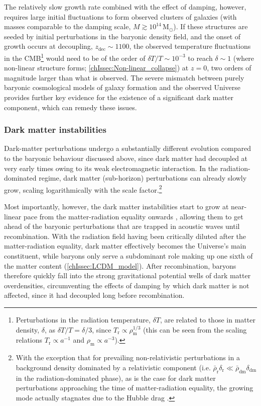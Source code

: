 The relatively slow growth rate combined with the effect of \citeauthor{1968ApJ...151..459S} damping, however, requires large initial fluctuations to form observed clusters of galaxies (with masses comparable to the damping scale, $M \gtrsim 10^{14} \, \mathrm{M_\odot}$). If these structures are seeded by initial perturbations in the baryonic density field, and the onset of growth occurs at decoupling, $z_\text{dec} \sim 1100$, the observed temperature fluctuations in the CMB\footnote{Perturbations in the radiation temperature, $\delta T$, are related to those in matter density, $\delta$, as $\delta T / T = \delta/3$, since $T_\text{r} \propto \rho_\text{m}^{1/3}$ (this can be seen from the scaling relations $T_\text{r} \propto a^{-1}$ and $\rho_\text{m} \propto a^{-3}$).} would need to be of the order of $\delta T / T \sim 10^{-3}$ to reach $\delta \sim 1$ (where non-linear structure forms; \cref{chIssec:Non-linear_collapse}) at $z = 0$, two orders of magnitude larger than what is observed. The severe mismatch between purely baryonic cosmological models of galaxy formation and the observed Universe provides further key evidence for the existence of a significant dark matter component, which can remedy these issues.

\subsubsection{Dark matter instabilities}
\label{chIsssec:Dark_matter_instabilities}

Dark-matter perturbations undergo a substantially different evolution compared to the baryonic behaviour discussed above, since dark matter had decoupled at very early times owing to its weak electromagnetic interaction. In the radiation-dominated regime, dark matter (sub-horizon) perturbations can already slowly grow, scaling logarithmically with the scale factor.\footnote{With the exception that for prevailing non-relativistic perturbations in a background density dominated by a relativistic component (i.e. $\bar{\rho}_\text{r} \delta_\text{r} \ll \bar{\rho}_\text{dm} \delta_\text{dm}$ in the radiation-dominated phase), as is the case for dark matter perturbations approaching the time of matter-radiation equality, the growing mode actually stagnates due to the Hubble drag \citep{1974A&A....37..225M}.}

Most importantly, however, the dark matter instabilities start to grow at near-linear pace from the matter-radiation equality onwards \citep{1992ARA&A..30..499C}, allowing them to get ahead of the baryonic perturbations that are trapped in acoustic waves until recombination. With the radiation field having been critically diluted after the matter-radiation equality, dark matter effectively becomes the Universe's main constituent, while baryons only serve a subdominant role making up one sixth of the matter content (\cref{chIssec:LCDM_model}). After recombination, baryons therefore quickly fall into the strong gravitational potential wells of dark matter overdensities, circumventing the effects of \citeauthor{1968ApJ...151..459S} damping by which dark matter is not affected, since it had decoupled long before recombination.

